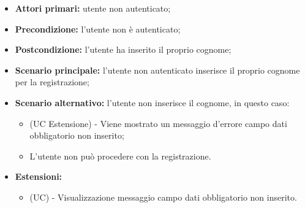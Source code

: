 \begin{itemize}
	\item \textbf{Attori primari:} utente non autenticato;
	\item \textbf{Precondizione:} l'utente non è autenticato;
	\item \textbf{Postcondizione:} l'utente ha inserito il proprio cognome;
	\item \textbf{Scenario principale:} l'utente non autenticato inserisce il proprio cognome per la registrazione;
	\item \textbf{Scenario alternativo:} l'utente non inserisce il cognome, in questo caso:
	\begin{itemize}
		\item (UC Estensione) - Viene mostrato un messaggio d'errore campo dati obbligatorio non inserito;
		\item L'utente non può procedere con la registrazione.
	\end{itemize}
	\item \textbf{Estensioni:}
	\begin{itemize}
		\item (UC) - Visualizzazione messaggio campo dati obbligatorio non inserito.
	\end{itemize}
\end{itemize}

